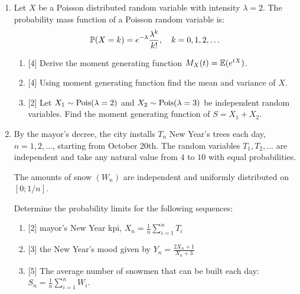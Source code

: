 \begin{enumerate}

\begin{enumerate}
    \item {[5]} Using a chainsaw
    cut the Markov chain into communicating classes and classify them as transient, positive recurrent or null-recurrent.
    \item {[1]} Is the chain irreducible?
    \item {[4]} Find the period of every state.
\end{enumerate}


    \item Let \( X \) be a Poisson distributed random variable with intensity \( \lambda = 2 \).  
The probability mass function of a Poisson random variable is:
\[
\P(X = k) = e^{-\lambda} \frac{ \lambda^k}{k!}, \quad k = 0, 1, 2, \dots
\]

\begin{enumerate}
    \item {[4]} Derive the moment generating function \( M_X(t) = \E(e^{tX})\).
    \item {[4]} Using moment generating function find the mean and variance of \(X\).
    \item {[2]} Let \( X_1 \sim \dPois(\lambda = 2) \) and \( X_2 \sim \dPois(\lambda = 3) \) be independent random variables. 
    Find the moment generating function of \( S = X_1 + X_2 \).
\end{enumerate}

\item By the mayor's decree, the city installs $T_n$ New Year's trees each day, \( n = 1, 2, \ldots \), starting from October 20th. 
The random variables $T_1, T_2, \dots$ are independent and take any natural value from $4$ to $10$ with equal probabilities. 

The amounts of snow $(W_n)$ are independent and uniformly distributed on $[0; 1/n]$. 

Determine the probability limits for the following sequences:
\begin{enumerate}
    \item {[2]} mayor's New Year kpi,   
    \(    X_n = \frac{1}{n} \sum_{i=1}^n T_i
    \)
    \item {[3]} the New Year's mood given by
    \(
    Y_n = \frac{2 X_n +1}{X_n + 3}
    \)
    \item {[5]} The average number of snowmen that can be built each day:
    \(
    S_n = \frac{1}{n} \sum_{i=1}^n W_i.
    \)
\end{enumerate}

\end{enumerate}


